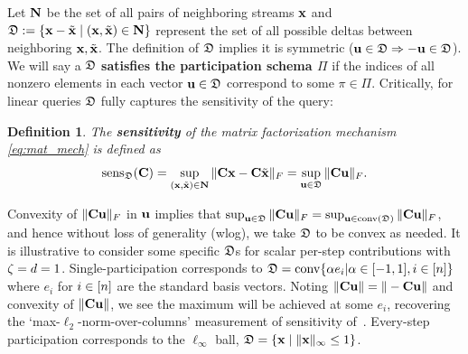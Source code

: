 \documentclass{article} %
\newtheorem{definition}{Definition}
\theoremstyle{named}
\begin{document}
Let $\mathbf{N}$ be the set of all pairs of neighboring streams $\mathbf{x}$ and $\mathfrak{D} := \left\{ \mathbf{x} - \tilde{\mathbf{x}} \mid (\mathbf{x}, \tilde{\mathbf{x}}) \in \mathbf{N} \right\}$ represent the set of all possible deltas between neighboring $\mathbf{x},\tilde{\mathbf{x}}$. The definition of $\mathfrak{D}$ implies it is symmetric ($\mathbf{u} \in \mathfrak{D} \Rightarrow -\mathbf{u} \in \mathfrak{D}$). We will say a $\mathfrak{D}$ \textbf{satisfies the participation schema $\Pi$} if the indices of all nonzero elements in each vector $\mathbf{u} \in \mathfrak{D}$ correspond to some $\pi \in \Pi$. Critically, for linear queries $\mathfrak{D}$ fully captures the sensitivity of the query:
\begin{definition}\label{def:sensopmech}
The \textbf{sensitivity} of the matrix factorization mechanism \cref{eq:mat_mech} is defined as
\begin{equation}\label{eq:sensopnorm}
\operatorname{sens}_{\mathfrak{D}}(\mathbf{C}) = \sup_{(\mathbf{x}, \tilde{\mathbf{x}}) \in \mathbf{N}} \| \mathbf{C} \mathbf{x} - \mathbf{C} \tilde{\mathbf{x}} \|_F
 = \sup_{\mathbf{u} \in \mathfrak{D}} \| \mathbf{C}\mathbf{u} \|_F. 
\end{equation}
\end{definition}
Convexity of $\|\mathbf{C}\mathbf{u}\|_F$ in $\mathbf{u}$ implies that $\sup_{\mathbf{u} \in \mathfrak{D}} \| \mathbf{C}\mathbf{u} \|_F = \sup_{\mathbf{u} \in \operatorname{conv}(\mathfrak{D})} \| \mathbf{C}\mathbf{u} \|_F$, and hence without loss of generality (wlog), we take $\mathfrak{D}$ to be convex as needed.
It is illustrative to consider some specific $\mathfrak{D}$s for scalar per-step contributions with $\zeta = d = 1$. Single-participation corresponds to $\mathfrak{D}  = \operatorname{conv}\{ \alpha e_i | \alpha \in [-1, 1], i \in [n] \}$ where $e_i$ for $i\in [n]$ are the standard basis vectors. Noting $\| \mathbf{C}\mathbf{u} \| = \| -\mathbf{C}\mathbf{u} \|$ and convexity of $\| \mathbf{C} \mathbf{u} \|$, we see the maximum will be achieved at some $e_i$, recovering the `max-$\ell_2$-norm-over-columns' measurement of sensitivity of~\citet[Proposition 3]{Li2015TheMM}. 
Every-step participation corresponds to the $\ell_\infty$ ball, $\mathfrak{D} = \{\mathbf{x} \mid \| \mathbf{x} \|_\infty \le 1\}$.
\end{document}
